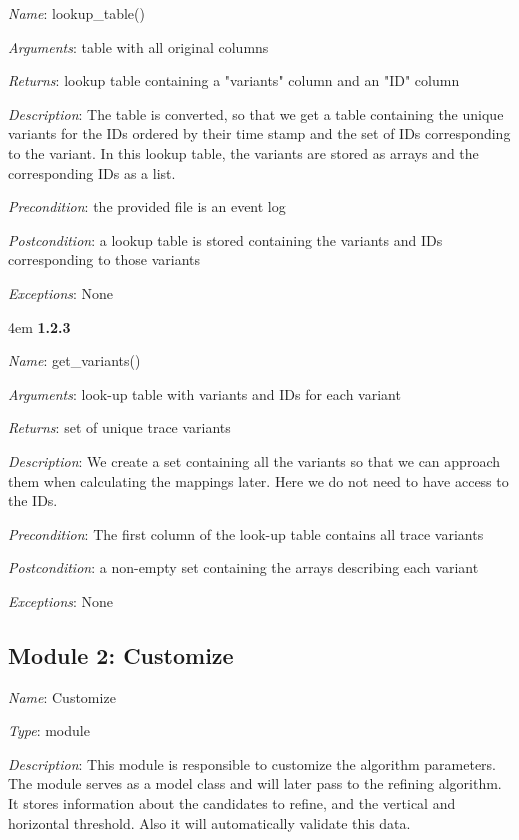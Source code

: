 \documentclass[notitlepage]{article}
\begin{document}
\begin{flushleft}
\textit{Name}: lookup\_table()

\textit{Arguments}: table with all original columns

\textit{Returns}: lookup table containing a "variants" column and an "ID" column

\textit{Description}: The table is converted, so that we get a table containing the unique variants for the IDs ordered by their time stamp and the set of IDs corresponding to the variant. In this lookup table, the variants are stored as arrays and the corresponding IDs as a list.

\textit{Precondition}: the provided file is an event log

\textit{Postcondition}: a lookup table is stored containing the variants and IDs corresponding to those variants

\textit{Exceptions}: None

\par
\endgroup

\medskip

\par
\begingroup
\leftskip4em
\textbf{1.2.3}

\textit{Name}: get\_variants()

\textit{Arguments}: look-up table with variants and IDs for each variant

\textit{Returns}: set of unique trace variants

\textit{Description}: We create a set containing all the variants so that we can approach them when calculating the mappings later. Here we do not need to have access to the IDs.

\textit{Precondition}: The first column of the look-up table contains all trace variants

\textit{Postcondition}: a non-empty set containing the arrays describing each variant

\textit{Exceptions}: None

\par
\endgroup

\subsection{Module 2: Customize}
\textit{Name}: Customize

\textit{Type}: module

\textit{Description}: This module is responsible to customize the algorithm parameters. The module serves as a model class and will later pass to the refining algorithm.
It stores information about the candidates to refine, and the vertical and horizontal threshold. Also it will automatically validate this data.  


\end{flushleft}
\end{document}
